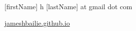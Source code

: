 \documentclass[DVI=12]{scrartcl}
\newlength{\datebox}\settowidth{\datebox}{Spring 2011} %
\newcommand{\NewEntry}[3]{\noindent\hangindent=2em\hangafter=0 \parbox{\datebox}{\small \textit{#1}}\hspace{1.5em} #2 #3 %
\vspace{0.5em}} %
\newcommand{\Description}[1]{\hangindent=2em\hangafter=0\noindent\raggedright\footnotesize{#1}\par\normalsize\vspace{1em}} %
\begin{document}
\thispagestyle{empty} %


\begin{cv}{}\vspace{1.5em} %




\begin{flushright}\footnotesize
%
%
%

[firstName] h [lastName] at gmail dot com

\href{https://jameshbailie.github.io/}{jameshbailie.github.io}

\end{flushright}

\vspace{1em} %




%


\end{cv}
\end{document}
